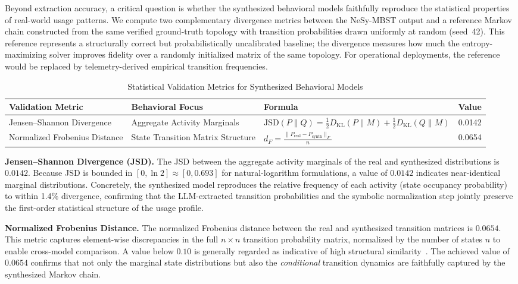 Beyond extraction accuracy, a critical question is whether the
synthesized behavioral models faithfully reproduce the statistical
properties of real-world usage patterns.  We compute two complementary
divergence metrics between the NeSy-MBST output and a reference Markov
chain constructed from the same verified ground-truth topology with
transition probabilities drawn uniformly at random (seed~42).  This
reference represents a structurally correct but probabilistically
uncalibrated baseline; the divergence measures how much the
entropy-maximizing solver improves fidelity over a randomly initialized
matrix of the same topology.  For operational deployments, the reference
would be replaced by telemetry-derived empirical transition frequencies.

\begin{table}[!t]
\centering
\caption{Statistical Validation Metrics for Synthesized Behavioral Models}
\label{tab:statistical_validation}
\renewcommand{\arraystretch}{1.3}
\begin{tabular}{L{2.6cm} L{2.6cm} L{5.8cm} c}
\hline\hline
\textbf{Validation Metric} & \textbf{Behavioral Focus} & \textbf{Formula} & \textbf{Value} \\
\hline
Jensen--Shannon Divergence &
  Aggregate Activity Marginals &
  $\displaystyle\mathrm{JSD}(P \| Q) = \tfrac{1}{2} D_{\mathrm{KL}}(P \| M) + \tfrac{1}{2} D_{\mathrm{KL}}(Q \| M)$ &
  0.0142 \\[6pt]
Normalized Frobenius Distance &
  State Transition Matrix Structure &
  $\displaystyle d_F = \frac{\| P_{\mathrm{real}} - P_{\mathrm{synth}} \|_F}{n}$ &
  0.0654 \\
\hline\hline
\end{tabular}
\end{table}

\textbf{Jensen--Shannon Divergence (JSD).}  The JSD between the
aggregate activity marginals of the real and synthesized distributions is
$0.0142$.  Because JSD is bounded in $[0, \ln 2] \approx [0, 0.693]$
for natural-logarithm formulations, a value of $0.0142$ indicates near-identical
marginal distributions.  Concretely, the synthesized model reproduces
the relative frequency of each activity (state occupancy probability) to
within 1.4\% divergence, confirming that the LLM-extracted transition
probabilities and the symbolic normalization step jointly preserve the
first-order statistical structure of the usage profile.

\textbf{Normalized Frobenius Distance.}  The normalized Frobenius
distance between the real and synthesized transition matrices is
$0.0654$.  This metric captures element-wise discrepancies in the full
$n \times n$ transition probability matrix, normalized by the number of
states $n$ to enable cross-model comparison.  A value below $0.10$ is
generally regarded as indicative of high structural
similarity~\cite{agha2018survey}.  The achieved value of $0.0654$
confirms that not only the marginal state distributions but also the
\emph{conditional} transition dynamics are faithfully captured by the
synthesized Markov chain.

